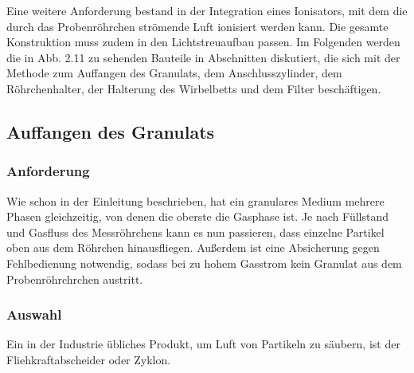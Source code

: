 Eine weitere Anforderung bestand in der Integration eines Ionisators, mit dem die durch das Probenröhrchen strömende Luft ionisiert werden kann. Die gesamte Konstruktion muss zudem in den Lichtstreuaufbau passen. Im Folgenden werden die in Abb. 2.11 zu sehenden Bauteile in Abschnitten diskutiert, die sich mit der Methode zum Auffangen des Granulats, dem Anschlusszylinder, dem Röhrchenhalter, der Halterung des Wirbelbetts und dem Filter beschäftigen.


\subsection{Auffangen des Granulats}

\subsubsection{Anforderung}

Wie schon in der Einleitung beschrieben, hat ein granulares Medium mehrere Phasen gleichzeitig, von denen die oberste die Gasphase ist. Je nach Füllstand und Gasfluss des Messröhrchens kann es nun passieren, dass einzelne Partikel oben aus dem Röhrchen hinausfliegen. Außerdem ist eine Absicherung gegen Fehlbedienung notwendig, sodass bei zu hohem Gasstrom kein Granulat aus dem Probenröhrchrchen austritt.

\subsubsection{Auswahl}

Ein in der Industrie übliches Produkt, um Luft von Partikeln zu säubern, ist der Fliehkraftabscheider oder Zyklon. 


